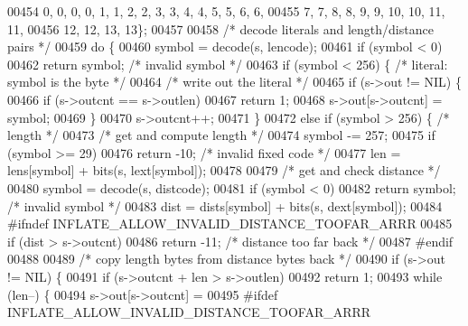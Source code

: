 \begin{DoxyCode}
00454         0, 0, 0, 0, 1, 1, 2, 2, 3, 3, 4, 4, 5, 5, 6, 6,
00455         7, 7, 8, 8, 9, 9, 10, 10, 11, 11,
00456         12, 12, 13, 13\};
00457 
00458     \textcolor{comment}{/* decode literals and length/distance pairs */}
00459     \textcolor{keywordflow}{do} \{
00460         symbol = decode(s, lencode);
00461         \textcolor{keywordflow}{if} (symbol < 0)
00462             \textcolor{keywordflow}{return} symbol;              \textcolor{comment}{/* invalid symbol */}
00463         \textcolor{keywordflow}{if} (symbol < 256) \{             \textcolor{comment}{/* literal: symbol is the byte */}
00464             \textcolor{comment}{/* write out the literal */}
00465             \textcolor{keywordflow}{if} (s->out != NIL) \{
00466                 \textcolor{keywordflow}{if} (s->outcnt == s->outlen)
00467                     \textcolor{keywordflow}{return} 1;
00468                 s->out[s->outcnt] = symbol;
00469             \}
00470             s->outcnt++;
00471         \}
00472         \textcolor{keywordflow}{else} \textcolor{keywordflow}{if} (symbol > 256) \{        \textcolor{comment}{/* length */}
00473             \textcolor{comment}{/* get and compute length */}
00474             symbol -= 257;
00475             \textcolor{keywordflow}{if} (symbol >= 29)
00476                 \textcolor{keywordflow}{return} -10;             \textcolor{comment}{/* invalid fixed code */}
00477             len = lens[symbol] + bits(s, lext[symbol]);
00478 
00479             \textcolor{comment}{/* get and check distance */}
00480             symbol = decode(s, distcode);
00481             \textcolor{keywordflow}{if} (symbol < 0)
00482                 \textcolor{keywordflow}{return} symbol;          \textcolor{comment}{/* invalid symbol */}
00483             dist = dists[symbol] + bits(s, dext[symbol]);
00484 \textcolor{preprocessor}{#ifndef INFLATE\_ALLOW\_INVALID\_DISTANCE\_TOOFAR\_ARRR}
00485             \textcolor{keywordflow}{if} (dist > s->outcnt)
00486                 \textcolor{keywordflow}{return} -11;     \textcolor{comment}{/* distance too far back */}
00487 \textcolor{preprocessor}{#endif}
00488 
00489             \textcolor{comment}{/* copy length bytes from distance bytes back */}
00490             \textcolor{keywordflow}{if} (s->out != NIL) \{
00491                 \textcolor{keywordflow}{if} (s->outcnt + len > s->outlen)
00492                     \textcolor{keywordflow}{return} 1;
00493                 \textcolor{keywordflow}{while} (len--) \{
00494                     s->out[s->outcnt] =
00495 \textcolor{preprocessor}{#ifdef INFLATE\_ALLOW\_INVALID\_DISTANCE\_TOOFAR\_ARRR}

\end{DoxyCode}
